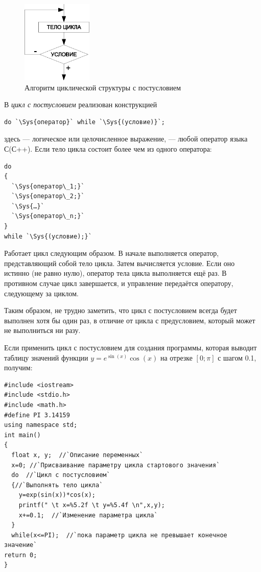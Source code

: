 \begin{figure}[htb]
\begin{center}
\includegraphics[width=0.3\textwidth]{img/ris_3_24}
\caption{Алгоритм циклической структуры с постусловием}
\label{ch03:refDrawing23}
\end{center}
\end{figure}

В  \emph{цикл с постусловием} реализован конструкцией
\begin{lstlisting}
do `\Sys{оператор}` while `\Sys{(условие)}`;
\end{lstlisting}
здесь  --- логическое или целочисленное выражение, 
 --- любой оператор языка С(С++). Если тело 
цикла состоит более чем из одного оператора:
\begin{lstlisting}
do
{
  `\Sys{оператор\_1;}`
  `\Sys{оператор\_2;}`
  `\Sys{…}`
  `\Sys{оператор\_n;}`
}
while `\Sys{(условие);}`
\end{lstlisting}

Работает цикл следующим образом. В начале выполняется оператор, представляющий собой тело цикла. Затем вычисляется
условие. Если оно истинно (не равно нулю), оператор тела цикла выполняется ещё раз. В противном случае цикл
завершается, и управление передаётся оператору, следующему за циклом.

Таким образом, не трудно заметить, что цикл с постусловием всегда будет выполнен хотя бы один раз, в отличие от цикла с
предусловием, который может не выполниться ни разу.

Если применить цикл с постусловием для создания программы, которая выводит таблицу 
значений функции  $y=e^{\sin (x)}\cos(x)$  на отрезке  $[0;\pi]$  с шагом 0.1, получим:

\begin{lstlisting}
#include <iostream>
#include <stdio.h>
#include <math.h>
#define PI 3.14159
using namespace std;
int main()
{
  float x, y;  //`Описание переменных`
  x=0; //`Присваивание параметру цикла стартового значения`
  do  //`Цикл с постусловием`
  {//`Выполнять тело цикла`
    y=exp(sin(x))*cos(x);
    printf(" \t x=%5.2f \t y=%5.4f \n",x,y);
    x+=0.1;  //`Изменение параметра цикла`
  }
  while(x<=PI);  //`пока параметр цикла не превышает конечное значение`
return 0;
}
\end{lstlisting}

